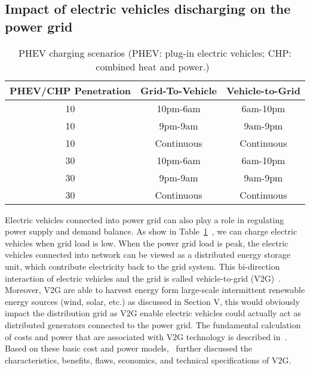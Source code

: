\subsection{Impact of electric vehicles discharging on the power grid}

\begin{table}[t]
	\caption{PHEV charging scenarios (PHEV: plug-in electric vehicles; CHP: combined heat and power.)~\cite{YC_Green,YC_Acha}}
	\centering
	\begin{tabular}{|c||c|c|}		
		\hline
		PHEV/CHP Penetration & Grid-To-Vehicle & Vehicle-to-Grid \\
		\hline \hline 
		10  & 10pm-6am & 6am-10pm \\
		\hline
		10 & 9pm-9am    & 9am-9pm \\
		\hline
		10 & Continuous & Continuous \\
		\hline
		30 & 10pm-6am   & 6am-10pm \\
		\hline
		30 & 9pm-9am    & 9am-9pm \\
		\hline
		30 & Continuous & Continuous \\	
		\hline			
	\end{tabular}		
	\label{YC_tab_v2G}
\end{table}

Electric vehicles connected into power grid can also play a role in regulating power supply and demand balance. 
As show in Table~\ref{YC_tab_v2G}~\cite{YC_Green,YC_Acha}, we can charge electric vehicles when grid load is low. 
When the power grid load is peak, the electric vehicles connected into network can be viewed as a distributed energy storage unit, which contribute electricity back to the grid system. 
This bi-direction interaction of electric vehicles and the grid is called vehicle-to-grid (V2G)~\cite{YC_V2Gconcept1,YC_V2Gconcept2}.
Moreover, V2G are able to harvest energy form large-scale intermittent renewable energy sources (wind, solar, etc.) as discussed in Section V, this would obviously impact the distribution grid as V2G enable electric vehicles could actually act as distributed generators connected to the power grid.
The fundamental calculation of costs and power that are associated with V2G technology is described in~\cite{YC_V2Gconcept1}. 
Based on these basic cost and power models,~\cite{YC_Reid,YC_Sutanto,YC_Brooks} further discussed the characteristics, benefits, flaws, economics, and technical specifications of V2G. 


